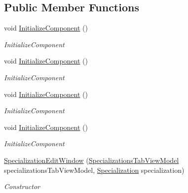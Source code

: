\subsection*{Public Member Functions}
\begin{DoxyCompactItemize}
\item 
void \hyperlink{class_baudi_1_1_client_1_1_view_1_1_edit_windows_1_1_specialization_edit_window_ada313e2b6e6dc0bb8c21b5dcebeb16c6}{Initialize\+Component} ()
\begin{DoxyCompactList}\small\item\em Initialize\+Component \end{DoxyCompactList}\item 
void \hyperlink{class_baudi_1_1_client_1_1_view_1_1_edit_windows_1_1_specialization_edit_window_ada313e2b6e6dc0bb8c21b5dcebeb16c6}{Initialize\+Component} ()
\begin{DoxyCompactList}\small\item\em Initialize\+Component \end{DoxyCompactList}\item 
void \hyperlink{class_baudi_1_1_client_1_1_view_1_1_edit_windows_1_1_specialization_edit_window_ada313e2b6e6dc0bb8c21b5dcebeb16c6}{Initialize\+Component} ()
\begin{DoxyCompactList}\small\item\em Initialize\+Component \end{DoxyCompactList}\item 
void \hyperlink{class_baudi_1_1_client_1_1_view_1_1_edit_windows_1_1_specialization_edit_window_ada313e2b6e6dc0bb8c21b5dcebeb16c6}{Initialize\+Component} ()
\begin{DoxyCompactList}\small\item\em Initialize\+Component \end{DoxyCompactList}\item 
\hyperlink{class_baudi_1_1_client_1_1_view_1_1_edit_windows_1_1_specialization_edit_window_a7015e982cf53a963d5cfccdcf002b880}{Specialization\+Edit\+Window} (\hyperlink{class_baudi_1_1_client_1_1_view_models_1_1_tabs_view_models_1_1_specializations_tab_view_model}{Specializations\+Tab\+View\+Model} specializations\+Tab\+View\+Model, \hyperlink{class_baudi_1_1_d_a_l_1_1_models_1_1_specialization}{Specialization} specialization)
\begin{DoxyCompactList}\small\item\em Constructor \end{DoxyCompactList}\end{DoxyCompactItemize}


